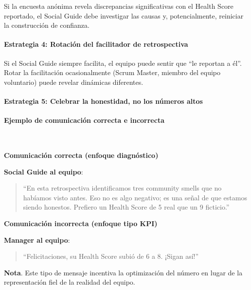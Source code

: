 Si la encuesta anónima revela discrepancias significativas con el Health Score reportado, el Social Guide debe investigar las causas y, potencialmente, reiniciar la construcción de confianza.

\paragraph{Estrategia 4: Rotación del facilitador de retrospectiva}

Si el Social Guide siempre facilita, el equipo puede sentir que ``le reportan a él''. Rotar la facilitación ocasionalmente (Scrum Master, miembro del equipo voluntario) puede revelar dinámicas diferentes.

\paragraph{Estrategia 5: Celebrar la honestidad, no los números altos}

\paragraph{Ejemplo de comunicación correcta e incorrecta}\mbox{}\\[-0.3\baselineskip]

\begin{escenario}

    \textbf{Comunicación correcta (enfoque diagnóstico)}

    \textbf{Social Guide al equipo}:
    \begin{quote}
        “En esta retrospectiva identificamos tres community smells
        que no habíamos visto antes. Eso no es algo negativo; es una señal
        de que estamos siendo honestos. Prefiero un Health Score de 5 real
        que un 9 ficticio.”
    \end{quote}

    \medskip

    \textbf{Comunicación incorrecta (enfoque tipo KPI)}

    \textbf{Manager al equipo}:
    \begin{quote}
        “Felicitaciones, su Health Score subió de 6 a 8. ¡Sigan así!”
    \end{quote}

    \medskip

    \textbf{Nota}. Este tipo de mensaje incentiva la optimización del número
    en lugar de la representación fiel de la realidad del equipo.

\end{escenario}

